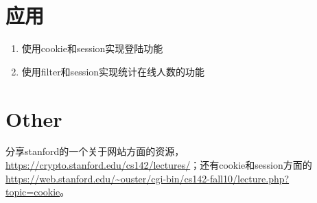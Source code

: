 \section{应用}
\begin{enumerate}
\item
使用cookie和session实现登陆功能
\item
使用filter和session实现统计在线人数的功能
\end{enumerate}

\section{Other}
分享stanford的一个关于网站方面的资源，\url{https://crypto.stanford.edu/cs142/lectures/}；还有cookie和session方面的\url{https://web.stanford.edu/~ouster/cgi-bin/cs142-fall10/lecture.php?topic=cookie}。
